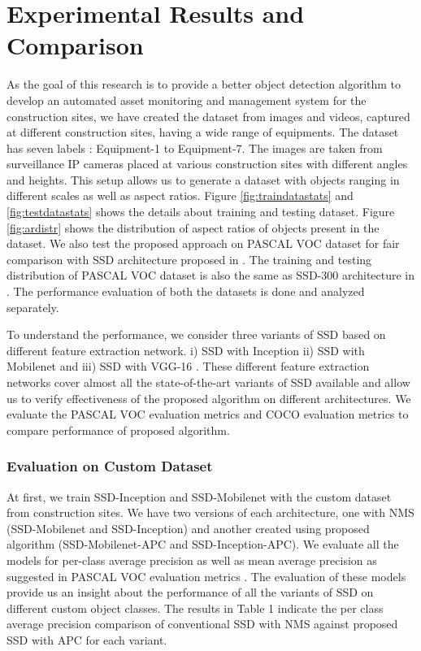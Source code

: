 \documentclass[conference]{IEEEtran}
\begin{document}
\section{Experimental Results and Comparison}
As the goal of this research is to provide a better object detection algorithm to develop an automated asset monitoring and management system for the construction sites, we have created the dataset from images and videos, captured at different construction sites, having a wide range of equipments. The dataset has seven labels : Equipment-1 to Equipment-7. The images are taken from surveillance IP cameras placed at various construction sites with different angles and heights. This setup allows us to generate a dataset with objects ranging in different scales as well as aspect ratios. Figure \ref{fig:traindatastats} and \ref{fig:testdatastats} shows the details about training and testing dataset. Figure \ref{fig:ardistr} shows the distribution of aspect ratios of objects present in the dataset. We also test the proposed approach on PASCAL VOC dataset \cite{everingham2010pascal} for fair comparison with SSD architecture proposed in \cite{DBLP:journals/corr/LiuAESR15}. The training and testing distribution of PASCAL VOC dataset is also the same as SSD-300 architecture in \cite{DBLP:journals/corr/LiuAESR15}. The performance evaluation of both the datasets is done and analyzed separately.      

To understand the performance, we consider three variants of SSD based on different feature extraction network. i) SSD with Inception \cite{DBLP:journals/corr/SzegedyVISW15} ii) SSD with Mobilenet \cite{DBLP:journals/corr/HowardZCKWWAA17} and iii) SSD with VGG-16 \cite{DBLP:journals/corr/LiuAESR15,simonyan2014very}. These different feature extraction networks cover almost all the state-of-the-art variants of SSD available and allow us to verify effectiveness of the proposed algorithm on different architectures. We evaluate the PASCAL VOC evaluation metrics and COCO evaluation metrics to compare performance of proposed algorithm. 

\subsubsection{Evaluation on Custom Dataset}
At first, we train SSD-Inception and SSD-Mobilenet with the custom dataset from construction sites. We have two versions of each architecture, one with NMS (SSD-Mobilenet and SSD-Inception) and another created using proposed algorithm (SSD-Mobilenet-APC and SSD-Inception-APC). We evaluate all the models for per-class average precision as well as mean average precision as suggested in PASCAL VOC evaluation metrics \cite{everingham2010pascal}. The evaluation of these models provide us an insight about the performance of all the variants of SSD on different custom object classes. The results in Table 1 indicate the per class average precision comparison of conventional SSD with NMS against proposed SSD with APC for each variant. 
\end{document}
